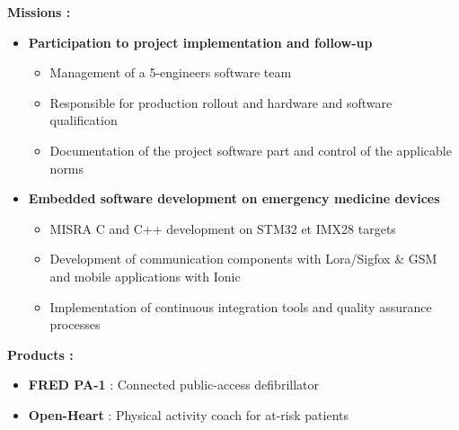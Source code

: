 {\begin{itemize}
	\end{itemize}
\else
	\textcolor{color1}{\textbf{Missions :}}
	\begin{itemize}
		\item \textbf{Participation to project implementation and follow-up}
		\begin{itemize}
			\item Management of a 5-engineers software team
			\item Responsible for production rollout and hardware and software qualification
			\item Documentation of the project software part and control of the applicable norms
		\end{itemize}
		\item \textbf{Embedded software development on emergency medicine devices}
		\begin{itemize}
			\item MISRA C and C++ development on STM32 et IMX28 targets
			\item Development of communication components with Lora/Sigfox \& GSM and mobile applications with Ionic
			\item Implementation of continuous integration tools and quality assurance processes
		\end{itemize}
	\end{itemize}
	\textcolor{color1}{\textbf{Products :}}
	\begin{itemize}
		\item \textbf{FRED PA-1} : Connected public-access defibrillator \textcolor{color1}{\href{http://www.schiller.ch/corp/en/product/fred-pa-1}{\ExternalLink}}
		\item \textbf{Open-Heart} : Physical activity coach for at-risk patients \textcolor{color1}{\href{http://www.schiller.ch/corp/en/schiller-cutting-edge-connected-health}{\ExternalLink}}
	\end{itemize}
\fi
}



\vspace{\ItemsSpacing}

